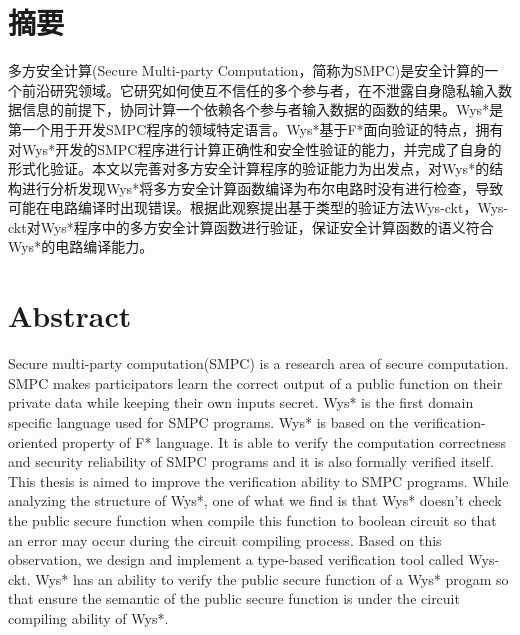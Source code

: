 



\chapter*{摘\quad 要}%
\setcounter{page}{1}%
多方安全计算(Secure Multi-party Computation，简称为SMPC)是安全计算的一个前沿研究领域。它研究如何使互不信任的多个参与者，在不泄露自身隐私输入数据信息的前提下，协同计算一个依赖各个参与者输入数据的函数的结果。Wys*是第一个用于开发SMPC程序的领域特定语言。Wys*基于F*面向验证的特点，拥有对Wys*开发的SMPC程序进行计算正确性和安全性验证的能力，并完成了自身的形式化验证。本文以完善对多方安全计算程序的验证能力为出发点，对Wys*的结构进行分析发现Wys*将多方安全计算函数编译为布尔电路时没有进行检查，导致可能在电路编译时出现错误。根据此观察提出基于类型的验证方法Wys-ckt，Wys-ckt对Wys*程序中的多方安全计算函数进行验证，保证安全计算函数的语义符合Wys*的电路编译能力。  


\chapter*{Abstract}%

Secure multi-party computation(SMPC) is a research area of secure computation. SMPC makes participators learn the correct output of a public function on their private data while keeping their own inputs secret. Wys* is the first domain specific language used for SMPC programs. Wys* is based on the verification-oriented property of F* language. It is able to verify the computation correctness and security reliability of SMPC programs and it is also formally verified itself. This thesis is aimed to improve the verification ability to SMPC programs. While analyzing the structure of Wys*, one of what we find is that Wys* doesn't check the public secure function when compile this function to boolean circuit so that an error may occur during the circuit compiling process. Based on this observation, we design and implement a type-based verification tool called Wys-ckt. Wys* has an ability to verify the public secure function of a Wys* progam so that ensure the semantic of the public secure function is under the circuit compiling ability of Wys*. 

